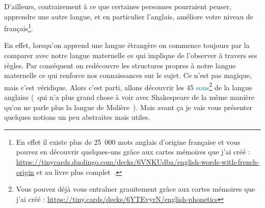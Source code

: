 D'ailleurs, contrairement à ce que certaines personnes pourraient
penser, apprendre une autre langue, et en particulier l'anglais,
améliore votre niveau de français\footnote{En effet il existe plus de
  25~000 mots anglais d'origine française et vous pouvez en découvrir
  quelques-uns grâce aux cartes mémoires que j'ai créé :   \url{https://tinycards.duolingo.com/decks/6VNKUdba/english-words-with-french-origin}
  et au livre plus complet~\cite{hw}.}.

En effet, lorsqu'on apprend une langue étrangère on commence toujours
par la comparer avec notre langue maternelle ce qui implique de
l'observer à travers ses règles. Par conséquent on redécouvre les
structures propres à notre langue maternelle ce qui renforce nos
connaissances sur le sujet. Ce n'est pas magique, mais c'est
véridique. Alors c'est parti, allons découvrir les 45
\textcolor{teal}{sons}\footnote{Vous pouvez déjà vous entraîner
  grauitement grâce aux cartes mémoires que j'ai créé : \url{https://tiny.cards/decks/6YTEvyrN/english-phonetics}}
de la langue anglaise (~qui n'a plus grand chose à voir avec 
Shakespeare de la même manière qu'on ne parle plus la langue de
Molière~). Mais avant ça je vais vous présenter quelques notions un peu
abstraites mais utiles. 

\newpage
\minitoc
